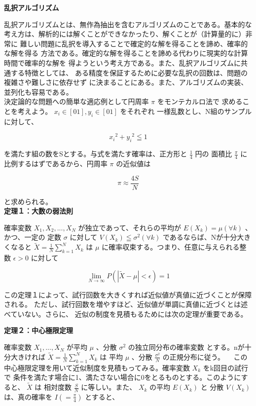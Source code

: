 \documentclass[10pt,a4paper,titlepage]{jreport} %
\begin{document}
\textbf{乱択アルゴリズム}

乱択アルゴリズムとは、無作為抽出を含むアルゴリズムのことである。基本的な
考え方は、解析的には解くことができなかったり、解くことが（計算量的に）非常に
難しい問題に乱択を導入することで確定的な解を得ることを諦め、確率的な解を得る
方法である。確定的な解を得ることを諦める代わりに現実的な計算時間で確率的な解を
得ようという考え方である。また、乱択アルゴリズムに共通する特徴としては、
ある精度を保証するために必要な乱択の回数は、問題の複雑さや難しさに依存せず
に決まることにある。また、アルゴリズムの実装、並列化も容易である。
\\
決定論的な問題への簡単な適応例として円周率 $\pi$ をモンテカルロ法で
求めることを考えよう。 $x_i \in [0 1], y_i \in [0 1]$ をそれぞれ
一様乱数とし、N組のサンプルに対して、

\begin{equation}
{x_i}^2 + {y_i}^2 \leqq 1
\end{equation}

を満たす組の数をSとする。与式を満たす確率は、正方形と $\frac{1}{4}$ 円の
面積比 $\frac{\pi}{4}$ に比例するはずであるから、円周率 $\pi$ の近似値は

\begin{equation}
\pi \approx \frac{4S}{N}
\end{equation}

と求められる。\\ 

\textbf{定理１：大数の弱法則}

確率変数 $X_1, X_2, ..., X_N$ が独立であって、それらの平均が $E(X_k) = \mu (\forall k)$ 、かつ、一定の
定数 $\sigma$ に対して $V(X_k) \leqq \sigma^2(\forall k)$ であるならば、Nが十分大きくなると
 $\widetilde{X} = \frac{1}{N} \sum_{k = 1}^{N} X_k$
は $\mu$ に確率収束する。つまり、任意に与えられる整数 $\epsilon > 0$ に対して

\begin{equation}
\lim_{N \to \infty} P(\left\lvert \widetilde{X} - \mu \right\rvert < \epsilon) = 1  
\end{equation}

この定理１によって、試行回数を大きくすれば近似値が真値に近づくことが保障される。
ただし、試行回数を増やすほど、近似値が単調に真値に近づくとは述べていない。さらに、
近似の制度を見積もるためには次の定理が重要である。

\textbf{定理２：中心極限定理}

確率変数 $X_1, ..., X_N$ が平均 $\mu$ 、分散 $\sigma^2$ の独立同分布の確率変数
とする。nが十分大きければ $\widetilde{X} = \frac{1}{N}\sum_{k = 1}^{N} X_k$ は
平均 $\mu$ 、分散 $\frac{\sigma^2}{N}$ の正規分布に従う。
　この中心極限定理を用いて近似制度を見積もってみる。確率変数 $X_k$ をk回目の試行で
条件を満たす場合に1、満たさない場合に0をとるものとする。このようにすると、 $\widetilde{X}$ は
相対度数 $\frac{S}{N}$ に等しい。また、 $X_k$ の平均 $E(X_k)$ と
分散 $V(X_k)$ は、真の確率を $I (= \frac{\pi}{4})$ とすると、
\end{document}
